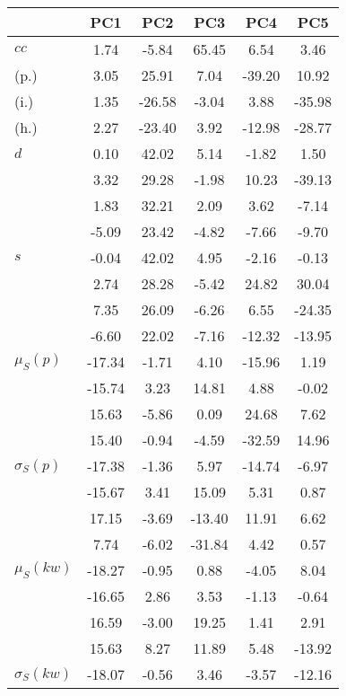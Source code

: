\begin{table}[h!]
\begin{center}
\begin{tabular}{| l | c | c | c | c | c |}\hline
 & PC1 & PC2 & PC3 & PC4 & PC5 \\\hline
$cc$ & 1.74  & -5.84  & 65.45  & 6.54  & 3.46 \\\hline
(p.) & 3.05  & 25.91  & 7.04  & -39.20  & 10.92 \\\hline
(i.) & 1.35  & -26.58  & -3.04  & 3.88  & -35.98 \\\hline
(h.) & 2.27  & -23.40  & 3.92  & -12.98  & -28.77 \\\hline
$d$ & 0.10  & 42.02  & 5.14  & -1.82  & 1.50 \\\hline
 & 3.32  & 29.28  & -1.98  & 10.23  & -39.13 \\\hline
 & 1.83  & 32.21  & 2.09  & 3.62  & -7.14 \\\hline
 & -5.09  & 23.42  & -4.82  & -7.66  & -9.70 \\\hline
$s$ & -0.04  & 42.02  & 4.95  & -2.16  & -0.13 \\\hline
 & 2.74  & 28.28  & -5.42  & 24.82  & 30.04 \\\hline
 & 7.35  & 26.09  & -6.26  & 6.55  & -24.35 \\\hline
 & -6.60  & 22.02  & -7.16  & -12.32  & -13.95 \\\hline
$\mu_S(p)$ & -17.34  & -1.71  & 4.10  & -15.96  & 1.19 \\\hline
 & -15.74  & 3.23  & 14.81  & 4.88  & -0.02 \\\hline
 & 15.63  & -5.86  & 0.09  & 24.68  & 7.62 \\\hline
 & 15.40  & -0.94  & -4.59  & -32.59  & 14.96 \\\hline
$\sigma_S(p)$ & -17.38  & -1.36  & 5.97  & -14.74  & -6.97 \\\hline
 & -15.67  & 3.41  & 15.09  & 5.31  & 0.87 \\\hline
 & 17.15  & -3.69  & -13.40  & 11.91  & 6.62 \\\hline
 & 7.74  & -6.02  & -31.84  & 4.42  & 0.57 \\\hline
$\mu_S(kw)$ & -18.27  & -0.95  & 0.88  & -4.05  & 8.04 \\\hline
 & -16.65  & 2.86  & 3.53  & -1.13  & -0.64 \\\hline
 & 16.59  & -3.00  & 19.25  & 1.41  & 2.91 \\\hline
 & 15.63  & 8.27  & 11.89  & 5.48  & -13.92 \\\hline
$\sigma_S(kw)$ & -18.07  & -0.56  & 3.46  & -3.57  & -12.16 \\\hline

\end{tabular}
\end{center}
\end{table}
